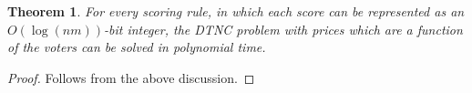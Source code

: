\documentclass[letterpaper]{article} %
\newtheorem{theorem}{Theorem}
\newcommand{\indic}{\mathbf{1}}
\newcommand{\DTNC}{\textsc{DTNC}}
\newcommand{\diff}{\mathrm{diff}}
\begin{document}
\begin{theorem}
For every scoring rule, in which each score can be represented as an $O(\log{(nm)})$-bit integer, the \DTNC{} problem with prices which are a function of the voters can be solved in polynomial time.
\end{theorem}
\begin{proof}
Follows from the above discussion.
\end{proof}
\end{document}
